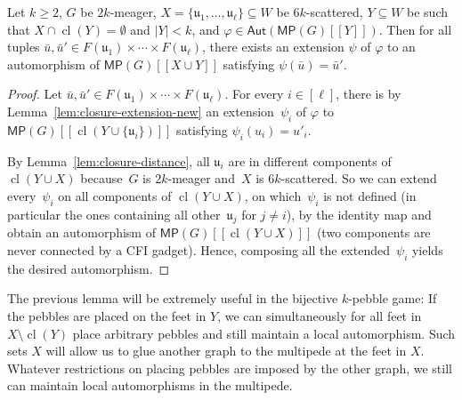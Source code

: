 \documentclass[]{lmcs}
\renewcommand{\phi}{\varphi}
\newcommand{\set}[1]{\lbrace #1 \rbrace}
\newcommand{\autoA}{\phi}
\newcommand{\autoB}{\psi}
\newcommand{\autGroup}[1]{\mathsf{Aut}(#1)}
\newcommand{\tup}[1]{\bar{#1}}
\newcommand{\vertA}{u}
\newcommand{\bVertA}{\mathfrak{u}}
\newcommand{\multipede}[1]{\mathsf{MP}(#1)}
\newcommand{\feetb}{W}
\newcommand{\footbset}{X}
\newcommand{\footbsetB}{Y}
\newcommand{\closure}[1]{\operatorname{cl}(#1)}
\newcommand{\footinduced}[2]{#1[[#2]]}
\newcommand{\feetOf}[1]{F(#1)}
\begin{document}
\begin{lem}
	\label{lem:distance-set-local-aut}
	Let $k \geq 2$,
	$G$ be $2k$-meager,
	$\footbset = \set{\bVertA_1,\dots, \bVertA_\ell} \subseteq \feetb$ be $6k$-scattered,
	${\footbsetB \subseteq \feetb}$ be
	such that $\footbset \cap \closure{\footbsetB} = \emptyset$
	and $|\footbsetB| < k$,
	and $\autoA\in \autGroup{\footinduced{\multipede{G}}{\footbsetB}}$.
	Then for all tuples ${\tup{\vertA},\tup{\vertA}' \in \feetOf{\bVertA_1} \times \cdots \times \feetOf{\bVertA_\ell}}$,
	there exists an extension $\autoB$ of $\autoA$ to an automorphism of
	$\footinduced{\multipede{G}}{\footbset \cup \footbsetB}$
	satisfying $\autoB(\tup{\vertA}) = \tup{\vertA}'$.
\end{lem}
\begin{proof}
	
	Let $\tup{\vertA},\tup{\vertA}' \in \feetOf{\bVertA_1} \times \cdots \times \feetOf{\bVertA_\ell}$.
	For every $i \in [\ell]$, there is by Lemma~\ref{lem:closure-extension-new} an extension~$\autoB_i$ of
	$\autoA$ to $\footinduced{\multipede{G}}{\closure{\footbsetB \cup \set{\bVertA_i}}}$
	satisfying $\autoB_i(\vertA_i) = \vertA'_i$.
	
	By Lemma~\ref{lem:closure-distance}, all $\bVertA_i$
	are in different components of $\closure{\footbsetB \cup \footbset}$
	because~$G$ is $2k$-meager and~$\footbset$ is $6k$-scattered.
	So we can extend every~$\autoB_i$ on all components  of $\closure{\footbsetB \cup \footbset}$,
	on which~$\autoB_i$ is not defined (in particular the ones containing all other~$\bVertA_j$ for $j\neq i$),
	by the identity map and obtain an automorphism of $\footinduced{\multipede{G}}{\closure{\footbsetB \cup \footbset}}$
	(two components are never connected by a CFI gadget).
	Hence, composing all the extended~$\autoB_i$ yields the desired automorphism.
\end{proof}

The previous lemma will be extremely useful in the bijective $k$-pebble game: If the pebbles are placed on the feet in $\footbsetB$,
we can simultaneously for all feet in $\footbset\setminus\closure{\footbsetB}$ place arbitrary pebbles 
and still maintain a local automorphism.
Such sets $\footbset$ will allow us to glue another graph to the multipede
at the feet in $\footbset$.
Whatever restrictions on placing pebbles are imposed by the other graph,
we still can maintain local automorphisms in the multipede.
\end{document}

